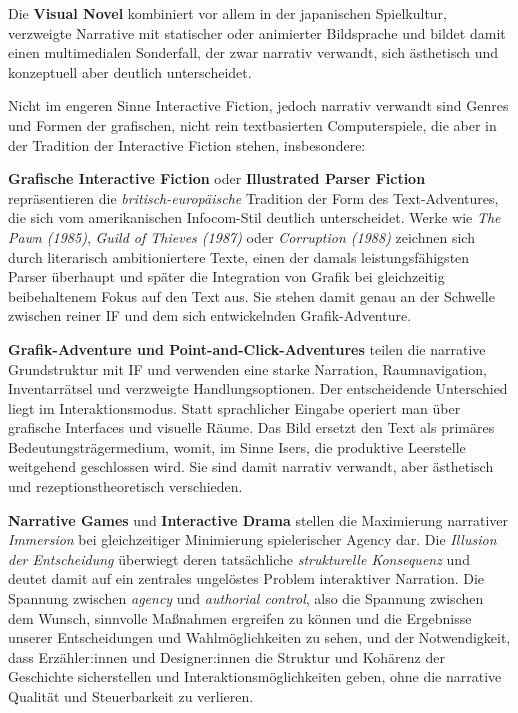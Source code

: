 \documentclass[parskip=half,a4paper,11pt]{scrreprt}
\begin{document}
Die \textbf{Visual Novel} kombiniert vor allem in der japanischen Spielkultur, verzweigte Narrative mit statischer oder animierter Bildsprache und bildet damit einen multimedialen Sonderfall, der zwar narrativ verwandt, sich ästhetisch und konzeptuell aber deutlich unterscheidet. 

Nicht im engeren Sinne Interactive Fiction, jedoch narrativ verwandt sind Genres und Formen der grafischen, nicht rein textbasierten Computerspiele, die aber in der Tradition der Interactive Fiction stehen, insbesondere:

\textbf{Grafische Interactive Fiction} oder \textbf{Illustrated Parser Fiction} repräsentieren die \textit{britisch-europäische} Tradition der Form des Text-Adventures, die sich vom amerikanischen Infocom-Stil deutlich unterscheidet. Werke wie \textit{The Pawn (1985)}, \textit{Guild of Thieves (1987)} oder \textit{Corruption (1988)} zeichnen sich durch literarisch ambitioniertere Texte, einen der damals leistungsfähigsten Parser überhaupt und später die Integration von Grafik bei gleichzeitig beibehaltenem Fokus auf den Text aus. Sie stehen damit genau an der Schwelle zwischen reiner IF und dem sich entwickelnden Grafik-Adventure.

\textbf{Grafik-Adventure und Point-and-Click-Adventures} teilen die narrative Grundstruktur mit IF und verwenden eine starke Narration, Raumnavigation, Inventarrätsel und verzweigte Handlungsoptionen. Der entscheidende Unterschied liegt im Interaktionsmodus. Statt sprachlicher Eingabe operiert man über grafische Interfaces und visuelle Räume. Das Bild ersetzt den Text als primäres Bedeutungsträgermedium, womit, im Sinne Isers, die produktive Leerstelle weitgehend geschlossen wird. Sie sind damit narrativ verwandt, aber ästhetisch und rezeptionstheoretisch verschieden.

\textbf{Narrative Games} und \textbf{Interactive Drama} stellen die Maximierung narrativer \textit{Immersion} bei gleichzeitiger Minimierung spielerischer Agency dar. Die \textit{Illusion der Entscheidung} überwiegt deren tatsächliche \textit{strukturelle Konsequenz} und deutet damit auf ein zentrales ungelöstes Problem interaktiver Narration. Die Spannung zwischen \textit{agency} und \textit{authorial control}, also die Spannung zwischen dem Wunsch, sinnvolle Maßnahmen ergreifen zu können und die Ergebnisse unserer Entscheidungen und Wahlmöglichkeiten zu sehen, und der Notwendigkeit, dass Erzähler:innen und Designer:innen die Struktur und Kohärenz der Geschichte sicherstellen und Interaktionsmöglichkeiten geben, ohne die narrative Qualität und Steuerbarkeit zu verlieren.
\end{document}
